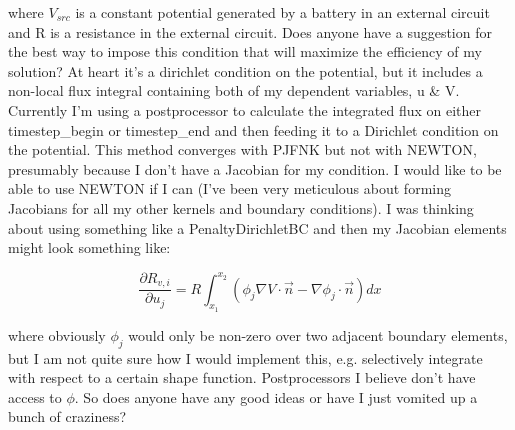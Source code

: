 \documentclass[12pt]{article}
\begin{document}
where $V_{src}$ is a constant potential generated by a battery in an external circuit and  R is a resistance in the external circuit. Does anyone have a suggestion for the best way to impose this condition that will maximize the efficiency of my solution? At heart it's a dirichlet condition on the potential, but it includes a non-local flux integral containing both of my dependent variables, u \& V. Currently I'm using a postprocessor to calculate the integrated flux on either timestep\_begin or timestep\_end and then feeding it to a Dirichlet condition on the potential. This method converges with PJFNK but not with NEWTON, presumably because I don't have a Jacobian for my condition. I would like to be able to use NEWTON if I can (I've been very meticulous about forming Jacobians for all my other kernels and boundary conditions). I was thinking about using something like a PenaltyDirichletBC and then my Jacobian elements might look something like:

\begin{equation}
\frac{\partial R_{v,i}}{\partial u_j} = R \int_{x_1}^{x_2}\left(\phi_j\nabla V\cdot\vec{n} -\nabla\phi_j\cdot\vec{n}\right)dx
\end{equation}

where obviously $\phi_j$ would only be non-zero over two adjacent boundary elements, but I am not quite sure how I would implement this, e.g. selectively integrate with respect to a certain shape function. Postprocessors I believe don't have access to $\phi$. So does anyone have any good ideas or have I just vomited up a bunch of craziness?
\end{document}
